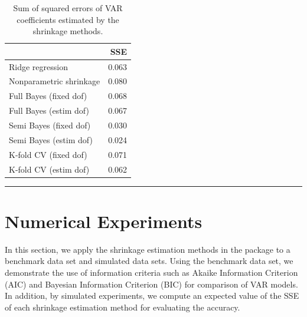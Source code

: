 \documentclass[
]{jss}
\begin{document}
\begin{CodeChunk}

\end{CodeChunk}

\begin{CodeChunk}
\begin{table}[t]

\caption{\label{tab:unnamed-chunk-15}Sum of squared errors of VAR coefficients estimated by the shrinkage methods.}
\centering
\begin{tabular}{l|r}
\hline
  & SSE\\
\hline
Ridge regression & 0.063\\
\hline
Nonparametric shrinkage & 0.080\\
\hline
Full Bayes (fixed dof) & 0.068\\
\hline
Full Bayes (estim dof) & 0.067\\
\hline
Semi Bayes (fixed dof) & 0.030\\
\hline
Semi Bayes (estim dof) & 0.024\\
\hline
K-fold CV (fixed dof) & 0.071\\
\hline
K-fold CV (estim dof) & 0.062\\
\hline
\end{tabular}
\end{table}

\end{CodeChunk}

\begin{center}\rule{0.5\linewidth}{\linethickness}\end{center}

\hypertarget{numerical-experiments}{%
\section{Numerical Experiments}\label{numerical-experiments}}

In this section, we apply the shrinkage estimation methods in the
package  to a benchmark data set and simulated data sets.
Using the benchmark data set, we demonstrate the use of information
criteria such as Akaike Information Criterion (AIC) and Bayesian
Information Criterion (BIC) for comparison of VAR models. In addition,
by simulated experiments, we compute an expected value of the SSE of
each shrinkage estimation method for evaluating the accuracy.
\end{document}
